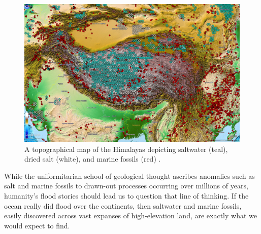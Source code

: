 \documentclass[10pt,twocolumn,letterpaper]{article}
\begin{document}
\begin{figure}[t]
\begin{center}
   \includegraphics[width=1\linewidth]{tibet.jpg}
\end{center}
   \caption{A topographical map of the Himalayas depicting saltwater (teal), dried salt (white), and marine fossils (red) \cite{15,16,86,87}.}
\label{fig:3}
\label{fig:onecol}
\end{figure}

While the uniformitarian school of geological thought ascribes anomalies such as salt and marine fossils to drawn-out processes occurring over millions of years, humanity's flood stories should lead us to question that line of thinking. If the ocean really did flood over the continents, then saltwater and marine fossils, easily discovered across vast expanses of high-elevation land, are exactly what we would expect to find.

\end{document}
